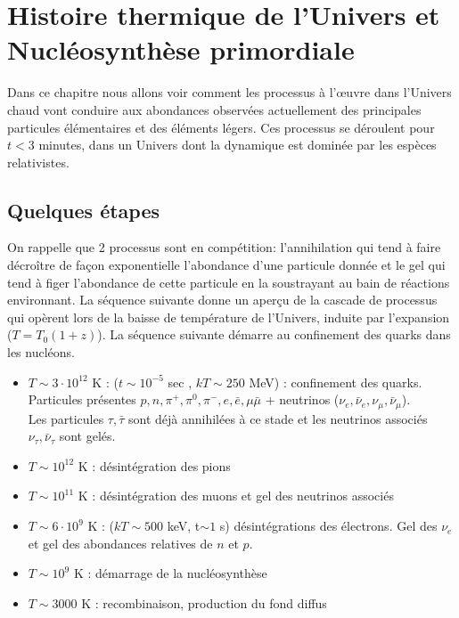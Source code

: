
\chapter{Histoire thermique de l'Univers et Nucléosynthèse primordiale}

Dans ce chapitre nous allons voir comment les processus à l'œuvre dans l'Univers chaud vont conduire aux abondances observées actuellement des principales particules élémentaires et des éléments légers. Ces processus se déroulent pour $t<3$ minutes, dans un Univers dont la dynamique est dominée par les espèces relativistes.

\section{Quelques étapes}
On rappelle que 2 processus sont en compétition: l'annihilation qui tend à faire décroître de façon exponentielle l'abondance d'une particule donnée et le gel qui tend à figer l'abondance de cette particule en la soustrayant au bain de réactions environnant. La séquence suivante donne un aperçu de la cascade de processus qui opèrent lors de la baisse de température de l'Univers, induite par l'expansion ($T=T_0(1+z)$). La séquence suivante démarre au confinement des quarks dans les nucléons.
\newline
\begin{itemize}
\item $T\sim 3\cdot 10^{12}$ K : ($t\sim 10^{-5}$ sec , $kT \sim 250$ MeV) : confinement des quarks. Particules présentes $p,n, \pi^+,\pi^0, \pi^-, e,\bar e, \mu \bar \mu$ + neutrinos ($\nu_e,\bar \nu_e, \nu_\mu, \bar \nu_\mu$).\\
Les particules $\tau, \bar \tau$ sont déjà annihilées à ce stade et les neutrinos associés $\nu_\tau, \bar \nu_\tau$ sont gelés.
 \item $T\sim 10^{12}$ K : désintégration des pions
 \item $T\sim 10^{11}$ K : désintégration des muons et gel des neutrinos associés
 \item $T\sim 6 \cdot 10^{9}$ K : ($kT \sim 500$ keV, t$\sim 1$ s) désintégrations des électrons. Gel des $\nu_e$ et gel des abondances relatives de $n$ et $p$.
 \item $T\sim 10^9$ K : démarrage de la nucléosynthèse
 \item $T\sim 3000$ K : recombinaison, production du fond diffus
\end{itemize}

